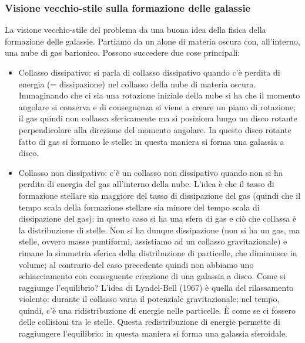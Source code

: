 \subsubsection{Visione vecchio-stile sulla formazione delle galassie}
La visione vecchio-stile del problema da una buona idea della fisica della formazione delle galassie. Partiamo da un alone di materia oscura con, all’interno, una nube di gas barionico. Possono succedere due cose principali:
\begin{itemize}
    \item  Collasso dissipativo: si parla di collasso dissipativo quando c’è perdita di energia (= dissipazione) nel collasso della nube di materia oscura. Immaginando che ci sia una rotazione iniziale della nube si ha che il momento angolare si conserva e di conseguenza si viene a creare un piano di rotazione; il gas quindi non collassa sfericamente ma si posiziona lungo un disco rotante perpendicolare alla direzione del momento angolare. In questo disco rotante fatto di gas si formano le stelle: in questa maniera si forma una galassia a disco.
    \item Collasso non dissipativo: c’è un collasso non dissipativo quando non si ha perdita di energia del gas all'interno della nube. L’idea è che il tasso di formazione stellare sia maggiore del tasso di dissipazione del gas (quindi che il tempo scala della formazione stellare sia minore del tempo scala di dissipazione del gas): in questo caso si ha una sfera di gas e ciò che collassa è la distribuzione di stelle. Non si ha dunque dissipazione (non si ha un gas, ma stelle, ovvero masse puntiformi,  assistiamo ad un collasso gravitazionale) e rimane la simmetria sferica della distribuzione di particelle, che diminuisce in volume; al contrario del caso precedente quindi non abbiamo uno schiacciamento con conseguente creazione di una galassia a disco. Come si raggiunge l’equilibrio? L’idea di Lyndel-Bell (1967) è quella del rilassamento  violento: durante il collasso varia il potenziale gravitazionale; nel tempo, quindi, c’è una ridistribuzione di energie nelle particelle. È come se ci fossero delle collisioni tra le stelle. Questa redistribuzione di energie permette di raggiungere l’equilibrio: in questa maniera si forma una galassia sferoidale.
\end{itemize}

